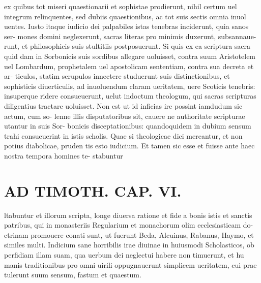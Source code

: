 \documentclass{article}
\begin{document}
\begin{pages}
ex quibus tot miseri quaestionarii et sophistae prodierunt, nihil certum uel integrum relinquentes, sed dubiis quaestionibus, ac tot suis sectis omnia inuol uentes. Iusto itaque iudicio dei palpabiles istas tenebras inciderunt, quia sanos ser- mones domini neglexerunt, sacras literas pro minimis duxerunt, subsannaue- runt, et philosophicis suis stultitiis postposuerunt. Si quis ex ea scriptura sacra quid dam in Sorbonicis suis sordibus allegare uoluisset, contra suum Aristotelem uel Lombardum, prophetalem uel apostolicam sententiam, contra sua decreta et ar- ticulos, statim scrupulos innectere studuerunt suis distinctionibus, et sophisticis diuerticulis, ad inuoluendum claram ueritatem, uere Scoticis tenebris: insuperque  ridere consueuerunt, uelut indoctum theologum, qui sacras scripturas diligentius tractare uoluisset. Non est ut id inficias ire possint iamdudum sic actum, cum so- lenne illis disputatoribus sit, cauere ne authoritate scripturae utantur in suis Sor- bonicis disceptationibus: quandoquidem in dubium sensum trahi consueuerint in istis scholis. Quae si theologicae dici mereantur, et non potius diabolicae, pruden tis esto iudicium. Et tamen sic esse et fuisse ante haec nostra tempora homines te- stabuntur  \pend
\section*{AD TIMOTH. CAP. VI. }
\marginpar{[ p.531 ]}\pstart ltabuntur et illorum scripta, longe diuersa ratione et fide a bonis istis et sanctis patribus, qui in monasteriis Regularium et monachorum olim ecclesiasticam do- ctrinam promouere conati sunt, ut fuerunt Beda, Alcuinus, Rabanus, Haymo, et similes multi. Indicium sane horribilis irae diuinae in huiusmodi Scholasticos, ob perfidiam illam suam, qua uerbum dei neglectui habere non timuerunt, et hu manis traditionibus pro omni uirili oppugnauerunt simplicem ueritatem, cui prae tulerunt suum sensum, fastum et quaestum.  \pend
{}
{}

\end{pages}
\end{document}
